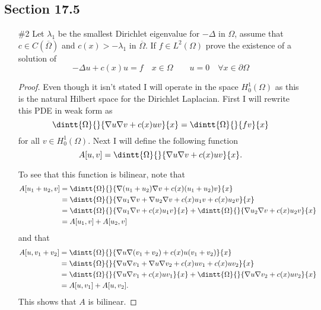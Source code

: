 \documentclass[11pt, oneside]{article}
\begin{document}
\subsection*{Section 17.5}
\begin{enumerate}
  \item[\#2]
    Let $\lambda_1$ be the smallest Dirichlet eigenvalue for $-\Delta$ in
    $\Omega$, assume that $c \in C(\overline{\Omega})$ and $c(x) > -\lambda_1$
    in $\overline{\Omega}$.
    If $f \in L^2(\Omega)$ prove the existence of a solution of
    \[
      -\Delta u + c(x) u = f \quad x \in \Omega \qquad u = 0 \quad \forall x \in \partial \Omega
    \]

    \begin{proof}
      Even though it isn't stated I will operate in the space $H^1_0(\Omega)$
      as this is the natural Hilbert space for the Dirichlet Laplacian.
      First I will rewrite this PDE in weak form as
      \[
        \dintt{\Omega}{}{\nabla u \nabla v + c(x) uv}{x} = \dintt{\Omega}{}{fv}{x}
      \]
      for all $v \in H^1_0(\Omega)$.
      Next I will define the following function
      \[
        A[u, v] = \dintt{\Omega}{}{\nabla u \nabla v + c(x) uv}{x}.
      \]

      To see that this function is bilinear, note that
      \begin{align*}
        A[u_1 + u_2, v] &= \dintt{\Omega}{}{\nabla (u_1 + u_2) \nabla v + c(x) (u_1 + u_2)v}{x} \\
        &= \dintt{\Omega}{}{\nabla u_1 \nabla v + \nabla u_2 \nabla v + c(x) u_1 v + c(x) u_2 v}{x} \\
        &= \dintt{\Omega}{}{\nabla u_1 \nabla v + c(x)u_1 v}{x} + \dintt{\Omega}{}{\nabla u_2 \nabla v + c(x) u_2 v}{x} \\
        &= A[u_1, v] + A[u_2, v]
      \end{align*}
      and that
      \begin{align*}
        A[u, v_1 + v_2] &= \dintt{\Omega}{}{\nabla u \nabla (v_1 + v_2) + c(x) u (v_1 + v_2)}{x} \\
        &= \dintt{\Omega}{}{\nabla u \nabla v_1 + \nabla u \nabla v_2 + c(x) u v_1 + c(x) u v_2}{x} \\
        &= \dintt{\Omega}{}{\nabla u \nabla v_1 + c(x) u v_1}{x} + \dintt{\Omega}{}{\nabla u \nabla v_2 + c(x) u v_2}{x} \\
        &= A[u, v_1] + A[u, v_2].
      \end{align*}
      This shows that $A$ is bilinear.


\end{proof}
\end{enumerate}
\end{document}
